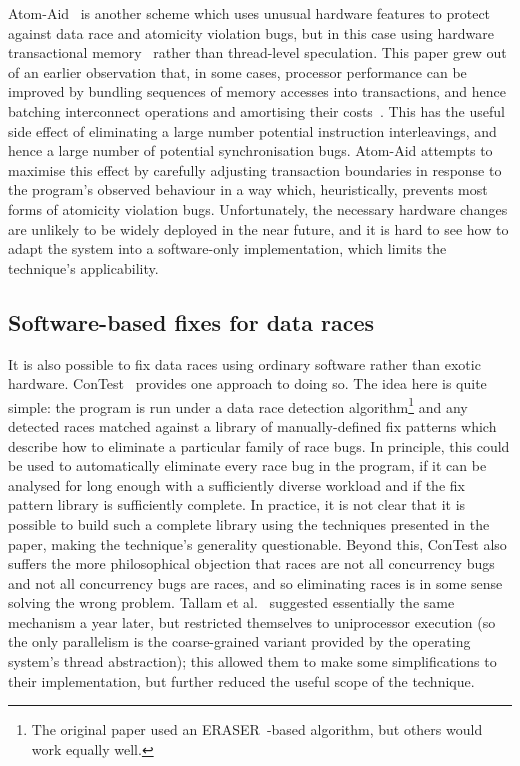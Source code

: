 Atom-Aid~\cite{Lucia2009} is another scheme which uses unusual
hardware features to protect against data race and atomicity violation
bugs, but in this case using hardware transactional
memory~\cite{Herlihy1993} rather than thread-level speculation.  This
paper grew out of an earlier observation that, in some cases,
processor performance can be improved by bundling sequences of memory
accesses into transactions, and hence batching interconnect operations
and amortising their costs~\cite{Ceze2007}.  This has the useful side
effect of eliminating a large number potential instruction
interleavings, and hence a large number of potential synchronisation
bugs.  Atom-Aid attempts to maximise this effect by carefully
adjusting transaction boundaries in response to the program's observed
behaviour in a way which, heuristically, prevents most forms of
atomicity violation bugs.  Unfortunately, the necessary hardware
changes are unlikely to be widely deployed in the near future, and it
is hard to see how to adapt the system into a software-only
implementation, which limits the technique's applicability.

\subsection{Software-based fixes for data races}
It is also possible to fix data races using ordinary software rather
than exotic hardware.  ConTest~\cite{FFFKrena2007} provides one
approach to doing so.  The idea here is quite simple: the program is
run under a data race detection algorithm\footnote{The original paper
  used an ERASER~\cite{Savage1997}-based algorithm, but others would
  work equally well.} and any detected races matched against a library
of manually-defined fix patterns which describe how to eliminate a
particular family of race bugs.  In principle, this could be used to
automatically eliminate every race bug in the program, if it can be
analysed for long enough with a sufficiently diverse workload and if
the fix pattern library is sufficiently complete.  In practice, it is
not clear that it is possible to build such a complete library using
the techniques presented in the paper, making the technique's generality
questionable.  Beyond this, ConTest also suffers the more
philosophical objection that races are not all concurrency bugs and
not all concurrency bugs are races, and so eliminating races is in
some sense solving the wrong problem.  Tallam et al.~\cite{Tallam2008}
suggested essentially the same mechanism a year later, but restricted
themselves to uniprocessor execution (so the only parallelism is the
coarse-grained variant provided by the operating system's thread
abstraction); this allowed them to make some simplifications to their
implementation, but further reduced the useful scope of the technique.

